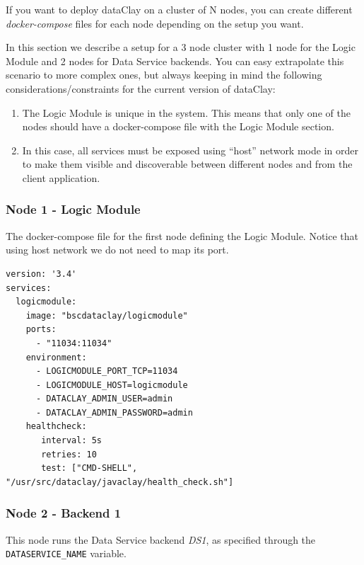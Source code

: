 If you want to deploy dataClay on a cluster of N nodes, you can create different \textit{docker-compose} files for each node depending on the setup you want.

In this section we describe a setup for a 3 node cluster with 1 node for the Logic Module and 2 nodes for Data Service backends. You can easy extrapolate this scenario to more complex ones, but always keeping in mind the following considerations/constraints for the current version of dataClay:

\begin{enumerate}
 \item The Logic Module is unique in the system. This means that only one of the nodes should have a docker-compose file with the Logic Module section.
 \item In this case, all services must be exposed using ``host'' network mode in order to make them visible and discoverable between different nodes and from the client application.
\end{enumerate}

\subsubsection{Node 1 - Logic Module}

The docker-compose file for the first node defining the Logic Module. Notice that using host network we do not need to map its port.

\begin{tBox}
 \begin{lstlisting}[language=docker-compose-2, frame=none]
version: '3.4'
services:
  logicmodule:
    image: "bscdataclay/logicmodule"
    ports:
      - "11034:11034"
    environment:
      - LOGICMODULE_PORT_TCP=11034
      - LOGICMODULE_HOST=logicmodule
      - DATACLAY_ADMIN_USER=admin
      - DATACLAY_ADMIN_PASSWORD=admin
    healthcheck:
       interval: 5s
       retries: 10
       test: ["CMD-SHELL", "/usr/src/dataclay/javaclay/health_check.sh"]
 \end{lstlisting}
\end{tBox}

\subsubsection{Node 2 - Backend 1}

This node runs the Data Service backend \textit{DS1}, as specified through the \texttt{DATASERVICE\_NAME} variable.

